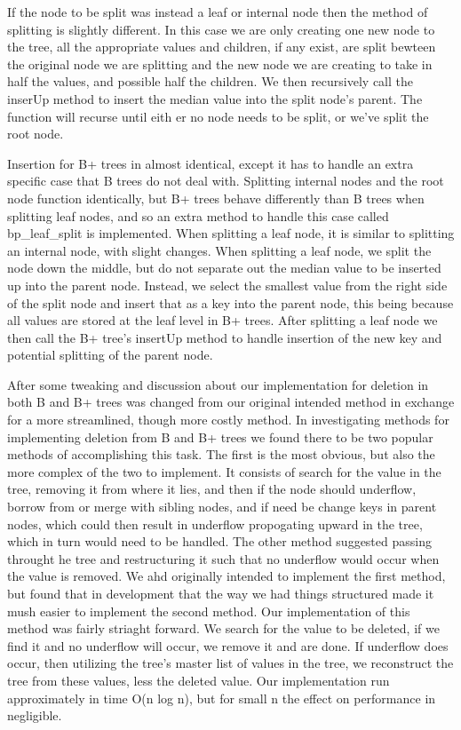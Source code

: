     If the node to be split was instead a leaf or internal node then the method of splitting is slightly different.  In this case we are only creating one new node to the tree, all the appropriate values and children, if any exist, are split bewteen the original node we are splitting and the new node we are creating to take in half the values, and possible half the children.  We then recursively call the inserUp method to insert the median value into the split node's parent.  The function will recurse until eith er no node needs to be split, or we've split the root node.
    
    Insertion for B+ trees in almost identical, except it has to handle an extra specific case that B trees do not deal with.  Splitting internal nodes and the root node function identically, but B+ trees behave differently than B trees when splitting leaf nodes, and so an extra method to handle this case called bp\_leaf\_split is implemented.  When splitting a leaf node, it is similar to splitting an internal node, with slight changes.  When splitting a leaf node, we split the node down the middle, but do not separate out the median value to be inserted up into the parent node.  Instead, we select the smallest value from the right side of the split node and insert that as a key into the parent node, this being because all values are stored at the leaf level in B+ trees.  After splitting a leaf node we then call the B+ tree's insertUp method to handle insertion of the new key and potential splitting of the parent node.
    
    After some tweaking and discussion about our implementation for deletion in both B and B+ trees was changed from our original intended method in exchange for a more streamlined, though more costly method.  In investigating methods for implementing deletion from B and B+ trees we found there to be two popular methods of accomplishing this task.  The first is the most obvious, but also the more complex of the two to implement.  It consists of search for the value in the tree, removing it from where it lies, and then if the node should underflow, borrow from or merge with sibling nodes, and if need be change keys in parent nodes, which could then result in underflow propogating upward in the tree, which in turn would need to be handled.  The other method suggested passing throught he tree and restructuring it such that no underflow would occur when the value is removed.  We ahd originally intended to implement the first method, but found that in development that the way we had things structured made it mush easier to implement the second method.  Our implementation of this method was fairly striaght forward.  We search for the value to be deleted, if we find it and no underflow will occur, we remove it and are done.  If underflow does occur, then utilizing the tree's master list of values in the tree, we reconstruct the tree from these values, less the deleted value.  Our implementation run approximately in time O(n log n), but for small n the effect on performance in negligible.

